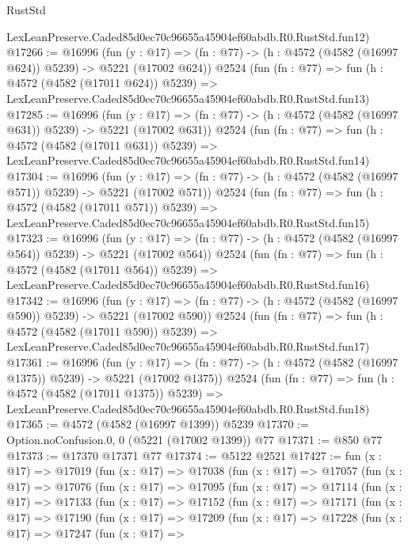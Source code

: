 \begin{lexlean}{RustStd}
\begin{coremodule}
    LexLeanPreserve.Caded85d0ec70c96655a45904ef60abdb.R0.RustStd.fun12)
@17266 := @16996
    (fun (y : @17) => (fn : @77) -> (h : @4572 (@4582 (@16997 @624)) @5239) -> @5221 (@17002 @624))
    @2524
    (fun (fn : @77) =>
    fun (h : @4572 (@4582 (@17011 @624)) @5239) =>
    LexLeanPreserve.Caded85d0ec70c96655a45904ef60abdb.R0.RustStd.fun13)
@17285 := @16996
    (fun (y : @17) => (fn : @77) -> (h : @4572 (@4582 (@16997 @631)) @5239) -> @5221 (@17002 @631))
    @2524
    (fun (fn : @77) =>
    fun (h : @4572 (@4582 (@17011 @631)) @5239) =>
    LexLeanPreserve.Caded85d0ec70c96655a45904ef60abdb.R0.RustStd.fun14)
@17304 := @16996
    (fun (y : @17) => (fn : @77) -> (h : @4572 (@4582 (@16997 @571)) @5239) -> @5221 (@17002 @571))
    @2524
    (fun (fn : @77) =>
    fun (h : @4572 (@4582 (@17011 @571)) @5239) =>
    LexLeanPreserve.Caded85d0ec70c96655a45904ef60abdb.R0.RustStd.fun15)
@17323 := @16996
    (fun (y : @17) => (fn : @77) -> (h : @4572 (@4582 (@16997 @564)) @5239) -> @5221 (@17002 @564))
    @2524
    (fun (fn : @77) =>
    fun (h : @4572 (@4582 (@17011 @564)) @5239) =>
    LexLeanPreserve.Caded85d0ec70c96655a45904ef60abdb.R0.RustStd.fun16)
@17342 := @16996
    (fun (y : @17) => (fn : @77) -> (h : @4572 (@4582 (@16997 @590)) @5239) -> @5221 (@17002 @590))
    @2524
    (fun (fn : @77) =>
    fun (h : @4572 (@4582 (@17011 @590)) @5239) =>
    LexLeanPreserve.Caded85d0ec70c96655a45904ef60abdb.R0.RustStd.fun17)
@17361 := @16996
    (fun (y : @17) =>
    (fn : @77) -> (h : @4572 (@4582 (@16997 @1375)) @5239) -> @5221 (@17002 @1375))
    @2524
    (fun (fn : @77) =>
    fun (h : @4572 (@4582 (@17011 @1375)) @5239) =>
    LexLeanPreserve.Caded85d0ec70c96655a45904ef60abdb.R0.RustStd.fun18)
@17365 := @4572 (@4582 (@16997 @1399)) @5239
@17370 := Option.noConfusion.{0, 0} (@5221 (@17002 @1399)) @77
@17371 := @850 @77
@17373 := @17370 @17371 @77
@17374 := @5122 @2521
@17427 := fun (x : @17) =>
  @17019
    (fun (x : @17) =>
    @17038
      (fun (x : @17) =>
      @17057
        (fun (x : @17) =>
        @17076
          (fun (x : @17) =>
          @17095
            (fun (x : @17) =>
            @17114
              (fun (x : @17) =>
              @17133
                (fun (x : @17) =>
                @17152
                  (fun (x : @17) =>
                  @17171
                    (fun (x : @17) =>
                    @17190
                      (fun (x : @17) =>
                      @17209
                        (fun (x : @17) =>
                        @17228
                          (fun (x : @17) =>
                          @17247
                            (fun (x : @17) =>

\end{coremodule}
\end{lexlean}
